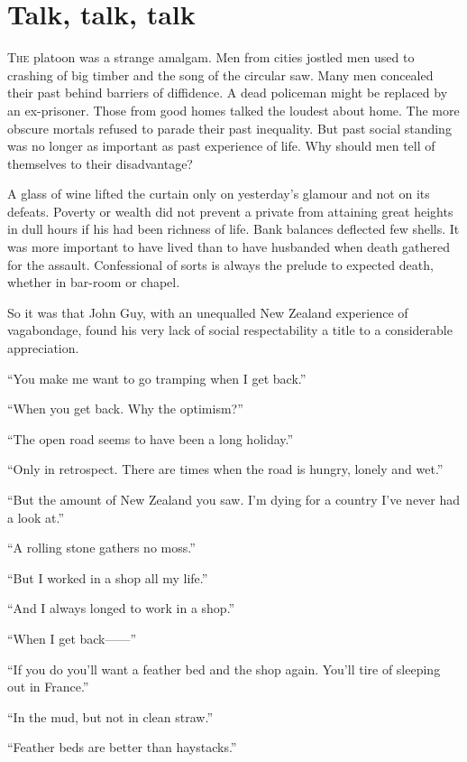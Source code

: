 \chapter*{\textsf{Talk, talk, talk}}

T\textsc{he} platoon was a strange amalgam. Men from cities jostled men used to crashing of big timber and the song of the circular saw. Many men concealed their past behind barriers of diffidence. A dead policeman might be replaced by an ex-prisoner. Those from good homes talked the loudest about home. The more obscure mortals refused to parade their past inequality. But past social standing was no longer as important as past experience of life. Why should men tell of themselves to their disadvantage?

A glass of wine lifted the curtain only on yesterday's glamour and not on its defeats. Poverty or wealth did not prevent a private from attaining great heights in dull hours if his had been richness of life. Bank balances deflected few shells. It was more important to have lived than to have husbanded when death gathered for the assault. Confessional of sorts is always the prelude to expected death, whether in bar-room or chapel.

So it was that John Guy, with an unequalled New Zealand experience of vagabondage, found his very lack of social respectability a title to a considerable appreciation.

``You make me want to go tramping when I get back.''

``When you get back. Why the optimism?''

``The open road seems to have been a long holiday.''

``Only in retrospect. There are times when the road is hungry, lonely and wet.''

``But the amount of New Zealand you saw. I'm dying for a country I've never had a look at.''

``A rolling stone gathers no moss.''

``But I worked in a shop all my life.''

``And I always longed to work in a shop.''

``When I get back------''

``If you do you'll want a feather bed and the shop again. You'll tire of sleeping out in France.''

``In the mud, but not in clean straw.''

``Feather beds are better than haystacks.''

